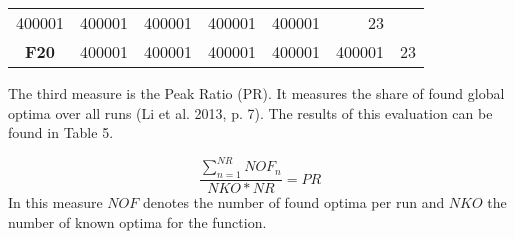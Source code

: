 \documentclass[12pt,a4paper]{article}
\begin{document}
\begin{longtable}[c]{@{}crrrrrr@{}}
\begin{minipage}[t]{0.08\columnwidth}
400001
\strut\end{minipage} &
\begin{minipage}[t]{0.08\columnwidth}\raggedleft\strut
400001
\strut\end{minipage} &
\begin{minipage}[t]{0.09\columnwidth}\raggedleft\strut
400001
\strut\end{minipage} &
\begin{minipage}[t]{0.10\columnwidth}\raggedleft\strut
400001
\strut\end{minipage} &
\begin{minipage}[t]{0.11\columnwidth}\raggedleft\strut
400001
\strut\end{minipage} &
\begin{minipage}[t]{0.07\columnwidth}\raggedleft\strut
23
\strut\end{minipage}\tabularnewline
\begin{minipage}[t]{0.11\columnwidth}\centering\strut
\textbf{F20}
\strut\end{minipage} &
\begin{minipage}[t]{0.08\columnwidth}\raggedleft\strut
400001
\strut\end{minipage} &
\begin{minipage}[t]{0.08\columnwidth}\raggedleft\strut
400001
\strut\end{minipage} &
\begin{minipage}[t]{0.09\columnwidth}\raggedleft\strut
400001
\strut\end{minipage} &
\begin{minipage}[t]{0.10\columnwidth}\raggedleft\strut
400001
\strut\end{minipage} &
\begin{minipage}[t]{0.11\columnwidth}\raggedleft\strut
400001
\strut\end{minipage} &
\begin{minipage}[t]{0.07\columnwidth}\raggedleft\strut
23
\strut\end{minipage}\tabularnewline
\bottomrule
\end{longtable}

The third measure is the Peak Ratio (PR). It measures the share of found
global optima over all runs (Li et al. 2013, p. 7). The results of this
evaluation can be found in Table 5.

\[\frac{\sum\nolimits_{n=1}^{NR} NOF_{n}}{NKO * NR} = PR\] \newline
In this measure \(NOF\) denotes the number of found optima per run and
\(NKO\) the number of known optima for the function. \newline
\end{document}

